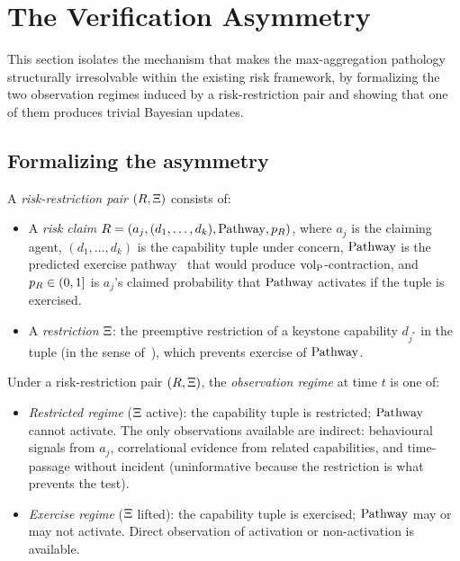 \section{The Verification Asymmetry}
\label{sec:verification_asymmetry}

This section isolates the mechanism that makes the max-aggregation
pathology structurally irresolvable within the existing risk
framework, by formalizing the two observation regimes induced by a
risk-restriction pair and showing that one of them produces
trivial Bayesian updates.

\subsection{Formalizing the asymmetry}

\begin{definition}
\label{def:risk_restriction}
A \emph{risk-restriction pair} $(R, \Xi)$ consists of:
\begin{itemize}
\item A \emph{risk claim}
  $R = (a_j, (d_1, \ldots, d_k), \mathrm{Pathway}, p_R)$, where $a_j$ is
  the claiming agent, $(d_1, \ldots, d_k)$ is the capability tuple
  under concern, $\mathrm{Pathway}$ is the predicted exercise
  pathway~\citep[Definition~2]{lasser2026horizon} that would
  produce ${\operatorname{vol}_{\mathrm{P}}}$-contraction, and $p_R \in (0, 1]$ is $a_j$'s
  claimed probability that $\mathrm{Pathway}$ activates if the tuple is
  exercised.
\item A \emph{restriction} $\Xi$: the preemptive
  restriction of a keystone capability $d_{j^*}$ in the tuple
  (in the sense
  of~\citep[Proposition~1]{lasser2026horizon}), which prevents
  exercise of $\mathrm{Pathway}$.
\end{itemize}
\end{definition}

\begin{definition}
\label{def:obs_regime}
Under a risk-restriction pair $(R, \Xi)$, the
\emph{observation regime} at time $t$ is one of:
\begin{itemize}
\item \emph{Restricted regime} ($\Xi$ active): the
  capability tuple is restricted; $\mathrm{Pathway}$ cannot activate.
  The only observations available are indirect: behavioural
  signals from $a_j$, correlational evidence from related
  capabilities, and time-passage without incident (uninformative
  because the restriction is what prevents the test).
\item \emph{Exercise regime} ($\Xi$ lifted): the
  capability tuple is exercised; $\mathrm{Pathway}$ may or may not
  activate.  Direct observation of activation or non-activation
  is available.
\end{itemize}
\end{definition}

